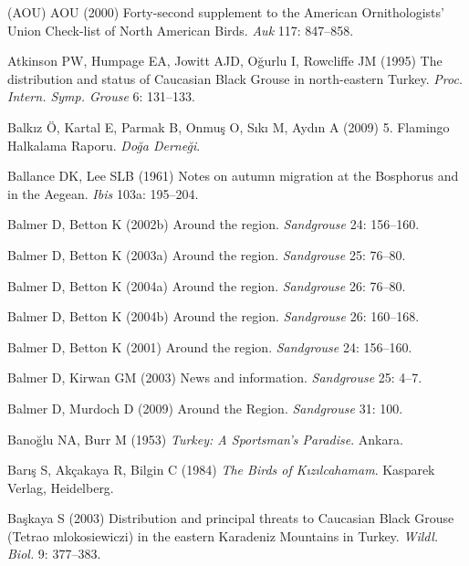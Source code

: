 \documentclass[
  letterpaper,
  DIV=11,
  numbers=noendperiod]{scrreprt}
\newlength{\cslhangindent}
\newenvironment{CSLReferences}[2] %
 {\begin{list}{}{%
  \setlength{\itemindent}{0pt}
  \setlength{\leftmargin}{0pt}
  \setlength{\parsep}{0pt}
  \ifodd #1
   \setlength{\leftmargin}{\cslhangindent}
   \setlength{\itemindent}{-1\cslhangindent}
  \fi
  \setlength{\itemsep}{#2\baselineskip}}}
 {\end{list}}
\begin{document}
\begin{CSLReferences}{0}{1}
(AOU) AOU (2000) {Forty-second supplement to the American
Ornithologists' Union Check-list of North American Birds}. \emph{Auk}
117: 847--858.

Atkinson PW, Humpage EA, Jowitt AJD, Oğurlu I, Rowcliffe JM (1995) {The
distribution and status of Caucasian Black Grouse in north-eastern
Turkey}. \emph{Proc. Intern. Symp. Grouse} 6: 131--133.

Balkız Ö, Kartal E, Parmak B, Onmuş O, Sıkı M, Aydın A (2009) {5.
Flamingo Halkalama Raporu}. \emph{Doğa Derneği}.

Ballance DK, Lee SLB (1961) {Notes on autumn migration at the Bosphorus
and in the Aegean}. \emph{Ibis} 103a: 195--204.

Balmer D, Betton K (2002b) {Around the region}. \emph{Sandgrouse} 24:
156--160.

Balmer D, Betton K (2003a) {Around the region}. \emph{Sandgrouse} 25:
76--80.

Balmer D, Betton K (2004a) {Around the region}. \emph{Sandgrouse} 26:
76--80.

Balmer D, Betton K (2004b) {Around the region}. \emph{Sandgrouse} 26:
160--168.

Balmer D, Betton K (2001) {Around the region}. \emph{Sandgrouse} 24:
156--160.

Balmer D, Kirwan GM (2003) {News and information}. \emph{Sandgrouse} 25:
4--7.

Balmer D, Murdoch D (2009) {Around the Region}. \emph{Sandgrouse} 31:
100.

Banoğlu NA, Burr M (1953) \emph{{Turkey: A Sportsman's Paradise}}.
Ankara.

Barış S, Akçakaya R, Bilgin C (1984) \emph{{The Birds of Kızılcahamam}}.
Kasparek Verlag, Heidelberg.

Başkaya S (2003) {Distribution and principal threats to Caucasian Black
Grouse ({Tetrao mlokosiewiczi}) in the eastern Karadeniz Mountains in
Turkey}. \emph{Wildl. Biol.} 9: 377--383.


\end{CSLReferences}
\end{document}
